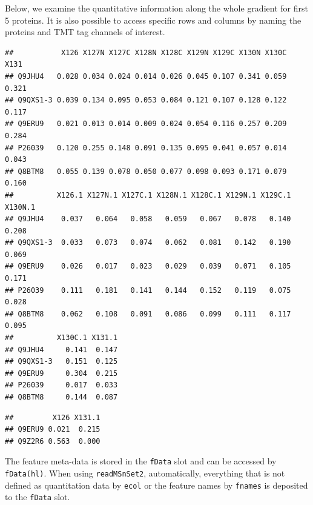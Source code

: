 Below, we examine the quantitative information along the whole
gradient for first 5 proteins.  It is also possible to access specific
rows and columns by naming the proteins and TMT tag channels of
interest.

\begin{knitrout}
\color{fgcolor}\begin{kframe}
\begin{alltt}
\hlstd{(hl)[}\hlopt{:}\hlstd{, ]}
\end{alltt}
\begin{verbatim}
##           X126 X127N X127C X128N X128C X129N X129C X130N X130C  X131
## Q9JHU4   0.028 0.034 0.024 0.014 0.026 0.045 0.107 0.341 0.059 0.321
## Q9QXS1-3 0.039 0.134 0.095 0.053 0.084 0.121 0.107 0.128 0.122 0.117
## Q9ERU9   0.021 0.013 0.014 0.009 0.024 0.054 0.116 0.257 0.209 0.284
## P26039   0.120 0.255 0.148 0.091 0.135 0.095 0.041 0.057 0.014 0.043
## Q8BTM8   0.055 0.139 0.078 0.050 0.077 0.098 0.093 0.171 0.079 0.160
##          X126.1 X127N.1 X127C.1 X128N.1 X128C.1 X129N.1 X129C.1 X130N.1
## Q9JHU4    0.037   0.064   0.058   0.059   0.067   0.078   0.140   0.208
## Q9QXS1-3  0.033   0.073   0.074   0.062   0.081   0.142   0.190   0.069
## Q9ERU9    0.026   0.017   0.023   0.029   0.039   0.071   0.105   0.171
## P26039    0.111   0.181   0.141   0.144   0.152   0.119   0.075   0.028
## Q8BTM8    0.062   0.108   0.091   0.086   0.099   0.111   0.117   0.095
##          X130C.1 X131.1
## Q9JHU4     0.141  0.147
## Q9QXS1-3   0.151  0.125
## Q9ERU9     0.304  0.215
## P26039     0.017  0.033
## Q8BTM8     0.144  0.087
\end{verbatim}
\begin{alltt}
\hlstd{(hl)[}\hlstd{(}\hlstd{,} \hlstd{),} \hlstd{(}\hlstd{,} \hlstd{)]}
\end{alltt}
\begin{verbatim}
##         X126 X131.1
## Q9ERU9 0.021  0.215
## Q9Z2R6 0.563  0.000
\end{verbatim}
\end{kframe}
\end{knitrout}

The feature meta-data is stored in the \texttt{fData} slot and can be
accessed by \texttt{fData(hl)}. When using \texttt{readMSnSet2}, automatically,
everything that is not defined as quantitation data by \texttt{ecol} or the
feature names by \texttt{fnames} is deposited to the \texttt{fData} slot. 

